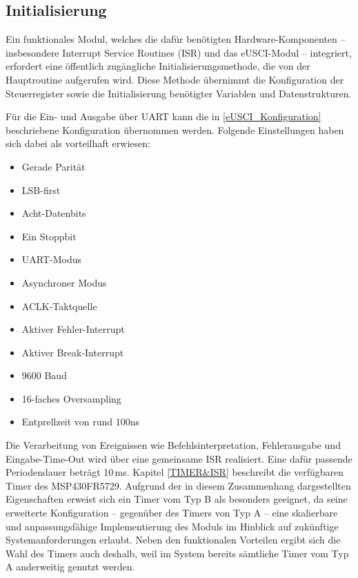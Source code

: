 \newpage
\subsection{Initialisierung}
\label{Init}

Ein funktionales Modul, welches die daf\"ur ben\"otigten Hardware-Komponenten – insbesondere Interrupt Service Routines (ISR) und das eUSCI-Modul – integriert, erfordert eine \"offentlich zug\"angliche Initialisierungsmethode, die von der Hauptroutine aufgerufen wird. Diese Methode \"ubernimmt die Konfiguration der Steuerregister sowie die Initialisierung ben\"otigter Variablen und Datenstrukturen.

F\"ur die Ein- und Ausgabe \"uber UART kann die in \ref{eUSCI_Konfiguration} beschriebene Konfiguration \"ubernommen werden. Folgende Einstellungen haben sich dabei als vorteilhaft erwiesen:

\begin{itemize}
	\item Gerade Parit\"at
	\item LSB-first
	\item Acht-Datenbits
	\item Ein Stoppbit
	\item UART-Modus
	\item Asynchroner Modus
	\item ACLK-Taktquelle
	\item Aktiver Fehler-Interrupt
	\item Aktiver Break-Interrupt
	\item 9600 Baud
	\item 16-faches Oversampling
	\item Entprellzeit von rund 100ns
\end{itemize}

Die Verarbeitung von Ereignissen wie Befehlsinterpretation, Fehlerausgabe und Eingabe-Time-Out wird \"uber eine gemeinsame ISR realisiert. Eine daf\"ur passende Periodendauer betr\"agt 10\,ms. Kapitel \ref{TIMER&ISR} beschreibt die verf\"ugbaren Timer des MSP430FR5729. Aufgrund der in diesem Zusammenhang dargestellten Eigenschaften erweist sich ein Timer vom Typ B als besonders geeignet, da seine erweiterte Konfiguration -- gegen\"uber des Timers von Typ A -- eine skalierbare und anpassungsf\"ahige Implementierung des Moduls im Hinblick auf zuk\"unftige Systemanforderungen erlaubt. Neben den funktionalen Vorteilen ergibt sich die Wahl des Timers auch deshalb, weil im System bereits s\"amtliche Timer vom Typ A anderweitig genutzt werden.

